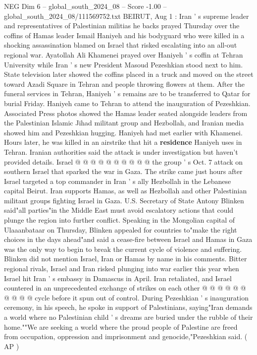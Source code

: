 \begin{textsample}{NEG Dim 6 – global\_south\_2024\_08 – Score -1.00 – global\_south\_2024\_08/111569752.txt}  \label{ex:f6_neg_130}
BEIRUT, Aug 1 : Iran ' s supreme leader and representatives of Palestinian militias he backs prayed Thursday over the coffins of Hamas leader Ismail Haniyeh and his bodyguard who were killed in a shocking assassination blamed on Israel that risked escalating into an all-out regional war.
Ayatollah Ali Khamenei prayed over Haniyeh ' s coffin at Tehran University while Iran ' s new President Masoud Pezeshkian stood next to him.
State television later showed the coffins placed in a truck and moved on the street toward Azadi Square in Tehran and people throwing flowers at them.
After the funeral services in Tehran, Haniyeh ' s remains are to be transferred to Qatar for burial Friday.
Haniyeh came to Tehran to attend the inauguration of Pezeshkian.
Associated Press photos showed the Hamas leader seated alongside leaders from the Palestinian Islamic Jihad militant group and Hezbollah, and Iranian media showed him and Pezeshkian hugging.
Haniyeh had met earlier with Khamenei.
Hours later, he was killed in an airstrike that hit a \textbf{residence} Haniyeh uses in Tehran.
Iranian authorities said the attack is under investigation but haven't provided details.
Israel @ @ @ @ @ @ @ @ @ @ the group ' s Oct. 7 attack on southern Israel that sparked the war in Gaza.
The strike came just hours after Israel targeted a top commander in Iran ' s ally Hezbollah in the Lebanese capital Beirut.
Iran supports Hamas, as well as Hezbollah and other Palestinian militant groups fighting Israel in Gaza.
U.S.
Secretary of State Antony Blinken said"all parties"in the Middle East must avoid escalatory actions that could plunge the region into further conflict.
Speaking in the Mongolian capital of Ulaaanbataar on Thursday, Blinken appealed for countries to"make the right choices in the days ahead"and said a cease-fire between Israel and Hamas in Gaza was the only way to begin to break the current cycle of violence and suffering.
Blinken did not mention Israel, Iran or Hamas by name in his comments.
Bitter regional rivals, Israel and Iran risked plunging into war earlier this year when Israel hit Iran ' s embassy in Damascus in April.
Iran retaliated, and Israel countered in an unprecedented exchange of strikes on each other @ @ @ @ @ @ @ @ @ @ cycle before it spun out of control.
During Pezeshkian ' s inauguration ceremony, in his speech, he spoke in support of Palestinians, saying"Iran demands a world where no Palestinian child ' s dreams are buried under the rubble of their home.""We are seeking a world where the proud people of Palestine are freed from occupation, oppression and imprisonment and genocide,"Pezeshkian said. ( AP )

\end{textsample}

